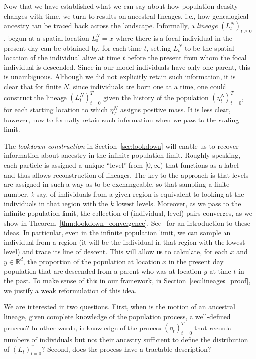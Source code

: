 \documentclass[12pt]{article}
\newcommand{\IR}{\mathbb R}
\numberwithin{equation}{section}
\begin{document}
Now that we have established what we can say about how 
population density changes with time,
we turn to results on ancestral lineages,
i.e., how genealogical ancestry can be traced back across the landscape.
Informally,
a \emph{lineage} $(L_t^N)_{t \ge 0}$,
begun at a spatial location $L_0^N = x$
where there is a focal individual in the present day
can be obtained by, for each time $t$,
setting $L_t^N$ to be the spatial location of the individual alive at time $t$
before the present from
whom the focal individual is descended.
Since in our model individuals have only one parent, this is unambiguous.
Although we did not explicitly retain such information,
it is clear that for finite $N$, since individuals are born one at a time, 
one could construct the lineage $(L_t^N)_{t=0}^T$
given the history of the population $(\eta^N_t)_{t = 0}^T$,
for each starting location to which $\eta^N_T$ assigns positive mass.
It is less clear, however, how to formally retain such information when we 
pass to the scaling limit.

The \emph{lookdown construction} in Section~\ref{sec:lookdown}
will enable us to recover information about ancestry in the infinite
population limit.
Roughly speaking,
each particle is assigned a unique ``level'' from $[0,\infty)$
that functions as a label and thus allows reconstruction of lineages.
The key to the approach is that levels are assigned in such a way as to be exchangeable, 
so that sampling a finite number, $k$ say, of
individuals from a given 
region is equivalent to looking at the individuals in that region with the $k$ lowest levels.
Moreover, as we pass to the infinite population limit,
the collection of (individual, level) pairs converges,
as we show in Theorem~\ref{thm:lookdown_convergence}.
See~\citet{etheridge/kurtz:2019} for an introduction to these ideas.
In particular, even in the infinite
population limit, we can sample an individual
from a region (it will be the individual in that region with the lowest level) 
and trace its line of descent. 
This will allow us to calculate, for each $x$ and $y\in\IR^d$, the proportion of
the population at location $x$ in the present day population that are descended from 
a parent who was at location $y$ at time $t$ in the past. To make
sense of this in our framework, in Section~\ref{sec:lineages_proof}, 
we justify a weak reformulation of this idea.

We are interested in two questions.
First, when is the motion of an ancestral 
lineage, given complete knowledge of the population process, a well-defined process?
In other words, is knowledge of the process $(\eta_t)_{t=0}^T$ that records 
numbers of individuals
but not their ancestry sufficient to define the distribution of $(L_t)_{t=0}^T$?
Second, does the process have a tractable description?
\end{document}
